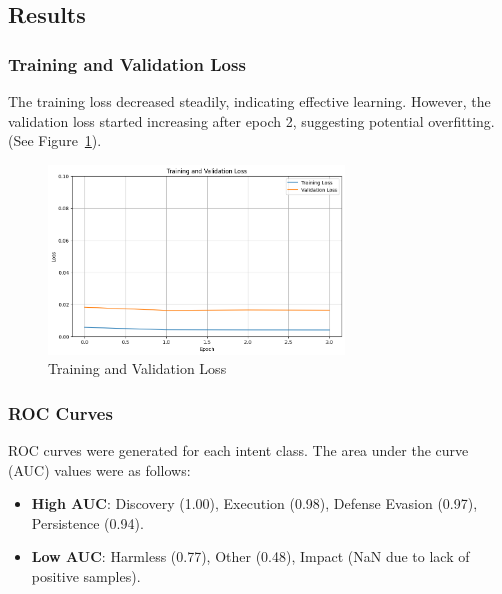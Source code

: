     \subsection{Results}

        \subsubsection{Training and Validation Loss \\}

            The training loss decreased steadily, indicating effective learning. However, the validation loss started increasing after epoch 2, suggesting potential overfitting. (See Figure~\ref{fig:loss}).

            \begin{figure}[h]
                \centering
                \includegraphics[width=0.7\textwidth]{../figures/plots/section4/loss_curves.png}
                \caption{Training and Validation Loss}
                \label{fig:loss}
            \end{figure}

        \subsubsection{ROC Curves \\}

            ROC curves were generated for each intent class. The area under the curve (AUC) values were as follows:
            
            \begin{itemize}
            
                \item \textbf{High AUC}: Discovery (1.00), Execution (0.98), Defense Evasion (0.97), Persistence (0.94).
                
                \item \textbf{Low AUC}: Harmless (0.77), Other (0.48), Impact (NaN due to lack of positive samples).
                
            \end{itemize}
            
